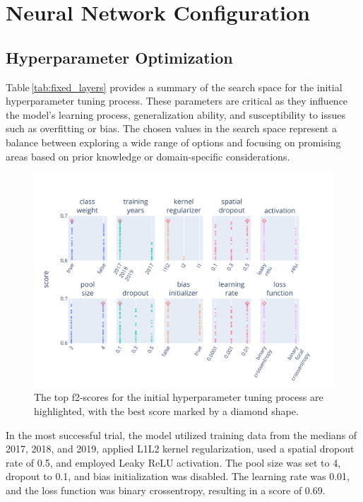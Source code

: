\chapter{Neural Network Configuration}
\label{chapter:hyper}
\section{Hyperparameter Optimization}




Table\,\ref{tab:fixed_layers} provides a summary of the search space for the initial hyperparameter tuning process. These parameters are critical as they influence the model's learning process, generalization ability, and susceptibility to issues such as overfitting or bias. The chosen values in the search space represent a balance between exploring a wide range of options and focusing on promising areas based on prior knowledge or domain-specific considerations.

\begin{figure}[ht]
    \centering
    \includegraphics[width=0.9\linewidth, trim={10pt 10pt 40pt 40pt}, clip]{figures/figures_tuner/fixed_layers.pdf}
    \caption{The top f2-scores for the initial hyperparameter tuning process are highlighted, with the best score marked by a diamond shape.}
    \label{fig:fixed_layers}
\end{figure}

In the most successful trial, the model utilized training data from the medians of 2017, 2018, and 2019, applied L1L2 kernel regularization, used a spatial dropout rate of 0.5, and employed Leaky ReLU activation. The pool size was set to 4, dropout to 0.1, and bias initialization was disabled. The learning rate was 0.01, and the loss function was binary crossentropy, resulting in a score of 0.69.

